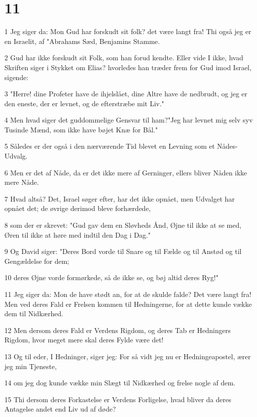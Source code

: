 \chapter{11}

\par 1 Jeg siger da: Mon Gud har forskudt sit folk? det være langt fra! Thi også jeg er en Israelit, af "Abrahams Sæd, Benjamins Stamme.
\par 2 Gud har ikke forskudt sit Folk, som han forud kendte. Eller vide I ikke, hvad Skriften siger i Stykket om Elias? hvorledes han træder frem for Gud imod Israel, sigende:
\par 3 "Herre! dine Profeter have de ihjelslået, dine Altre have de nedbrudt, og jeg er den eneste, der er levnet, og de efterstræbe mit Liv."
\par 4 Men hvad siger det guddommelige Gensvar til ham?"Jeg har levnet mig selv syv Tusinde Mænd, som ikke have bøjet Knæ for Bål."
\par 5 Således er der også i den nærværende Tid blevet en Levning som et Nådes-Udvalg.
\par 6 Men er det af Nåde, da er det ikke mere af Gerninger, ellers bliver Nåden ikke mere Nåde.
\par 7 Hvad altså? Det, Israel søger efter, har det ikke opnået, men Udvalget har opnået det; de øvrige derimod bleve forhærdede,
\par 8 som der er skrevet: "Gud gav dem en Sløvheds Ånd, Øjne til ikke at se med, Øren til ikke at høre med indtil den Dag i Dag."
\par 9 Og David siger: "Deres Bord vorde til Snare og til Fælde og til Anstød og til Gengældelse for dem;
\par 10 deres Øjne vorde formørkede, så de ikke se, og bøj altid deres Ryg!"
\par 11 Jeg siger da: Mon de have stødt an, for at de skulde falde? Det være langt fra! Men ved deres Fald er Frelsen kommen til Hedningerne, for at dette kunde vække dem til Nidkærhed.
\par 12 Men dersom deres Fald er Verdens Rigdom, og deres Tab er Hedningers Rigdom, hvor meget mere skal deres Fylde være det!
\par 13 Og til eder, I Hedninger, siger jeg: For så vidt jeg nu er Hedningeapostel, ærer jeg min Tjeneste,
\par 14 om jeg dog kunde vække min Slægt til Nidkærhed og frelse nogle af dem.
\par 15 Thi dersom deres Forkastelse er Verdens Forligelse, hvad bliver da deres Antagelse andet end Liv ud af døde?
